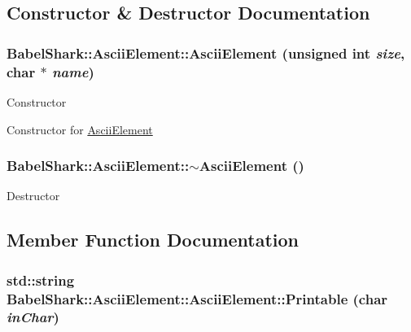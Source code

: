 \subsection{Constructor \& Destructor Documentation}
\hypertarget{class_babel_shark_1_1_ascii_element_d634e18161b86d3f0da9215606c6ce24}{
\subsubsection[{AsciiElement}]{\setlength{\rightskip}{0pt plus 5cm}BabelShark::AsciiElement::AsciiElement (unsigned int {\em size}, \/  char $\ast$ {\em name})}}
\label{class_babel_shark_1_1_ascii_element_d634e18161b86d3f0da9215606c6ce24}


Constructor

Constructor for \hyperlink{class_babel_shark_1_1_ascii_element}{AsciiElement} \hypertarget{class_babel_shark_1_1_ascii_element_066a61d5d3f348ebc35d8c29de080e05}{
\subsubsection[{$\sim$AsciiElement}]{\setlength{\rightskip}{0pt plus 5cm}BabelShark::AsciiElement::$\sim$AsciiElement ()}}
\label{class_babel_shark_1_1_ascii_element_066a61d5d3f348ebc35d8c29de080e05}


Destructor 

\subsection{Member Function Documentation}
\hypertarget{class_babel_shark_1_1_ascii_element_028fbaa4877f1ae574211247d68d0e70}{
\subsubsection[{AsciiElement::Printable}]{\setlength{\rightskip}{0pt plus 5cm}std::string BabelShark::AsciiElement::AsciiElement::Printable (char {\em inChar})}}
\label{class_babel_shark_1_1_ascii_element_028fbaa4877f1ae574211247d68d0e70}


